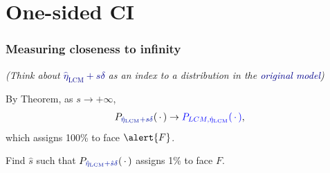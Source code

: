 \documentclass[ 10pt]{beamer}
\def\RR{{\mathbb R}}
\newcommand{\fatdot}{\,\cdot\,}
\newcommand{\etaLCM}{\hat{\eta}_{\textrm{LCM}}}
\begin{document}
\section{One-sided CI}
\frame
{
  \frametitle{Measuring closeness to infinity}  



%
%
%


\emph{(Think about \textcolor{darkblue}{$\etaLCM + s \delta$} as an index to a distribution in the \textcolor{darkblue}{original model})}
\vspace{3mm}

By Theorem, as $s \to +\infty$,
\begin{align*}
P_{\textcolor{darkblue}{\etaLCM + s \delta}}(\fatdot) \to \textcolor{blue}{P_{LCM, \etaLCM}(\fatdot)},
\end{align*}
which assigns 100\% to face $\alert{F}$.
\vspace{3mm}

\pause
Find $\hat{s}$ such that $P_{\textcolor{darkblue}{\etaLCM + \hat{s} \delta}}(\fatdot )$
assigns 1\% to face \alert{$F$}.  
\vspace{2mm}


}
\end{document}
